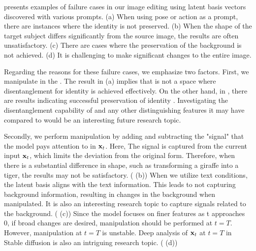 presents examples of failure cases in our image editing using latent basis vectors discovered with various prompts.
(a) When using pose or action as a prompt, there are instances where the identity is not preserved.
(b) When the shape of the target subject differs significantly from the source image, the results are often unsatisfactory.
(c) There are cases where the preservation of the background is not achieved.
(d) It is challenging to make significant changes to the entire image.

Regarding the reasons for these failure cases, we emphasize two factors.
First, we manipulate in the \exspace{}. %
The result in  (a) implies that \exspace{} is not a space where disentanglement for identity is achieved effectively.
On the other hand, in \ehspace{}, there are results indicating successful preservation of identity \cite{kwon2022diffusion, haas2023discovering}. 
Investigating the disentanglement capability of \exspace{} and any other distinguishing features it may have compared to \ehspace{} would be an interesting future research topic.

Secondly, we perform manipulation by adding and subtracting the "signal" that the model pays attention to in $\mathbf{x}_t$.
Here, The signal is captured from the current input $\mathbf{x}_t$, which limits the deviation from the original form. Therefore, when there is a substantial difference in shape, such as transforming a giraffe into a tiger, the results may not be satisfactory. ( (b))
When we utilize text conditions, the latent basis aligns with the text information. This leads to not capturing background information, resulting in changes in the background when manipulated. It is also an interesting research topic to capture signals related to the background. ( (c))
Since the model focuses on finer features as t approaches 0, if broad changes are desired, manipulation should be performed at $t=T$. However, manipulation at $t=T$ is unstable. Deep analysis of $\mathbf{x}_t$ at $t=T$ in Stable diffusion is also an intriguing research topic. ( (d))

